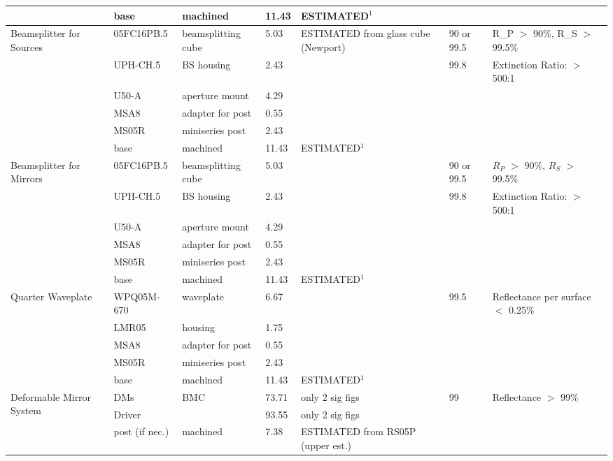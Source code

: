 \documentclass[12pt]{article}
\begin{document}
\begin{landscape}
\begin{center}
\begin{longtable}{| p{3.25cm} | p{2.2cm} | p{3cm} | p{1.75cm} | p{2.5cm} | p{1.55cm} | p{5cm} |}
          & base  & machined & 11.43 & ESTIMATED$^1$ &       &  \\ \hline
    \multirow{6}{*}{\parbox{3.25cm}{Beamsplitter for Sources}} & 05FC16PB.5 & beamsplitting cube & 5.03  & ESTIMATED from glass cube (Newport) & 90 or 99.5 & R\_P $>$ 90\%, R\_S $>$ 99.5\% \\ 
          & UPH-CH.5 & BS housing & 2.43  &       & 99.8  & Extinction Ratio: $>$ 500:1 \\
          & U50-A & aperture mount & 4.29  &       &       &  \\
          & MSA8  & adapter for post & 0.55  &       &       &  \\
          & MS05R & miniseries post & 2.43  &       &       &  \\
          & base  & machined & 11.43 & ESTIMATED$^1$ &       &  \\ \hline
    \multirow{6}{*}{\parbox{3.25cm}{Beamsplitter for Mirrors}} & 05FC16PB.5 & beamsplitting cube & 5.03  &       & 90 or 99.5 & $R_P$ $>$ 90\%, $R_S$ $>$ 99.5\% \\ 
          & UPH-CH.5 & BS housing & 2.43  &       & 99.8  & Extinction Ratio: $>$ 500:1 \\
          & U50-A & aperture mount & 4.29  &       &       &  \\
          & MSA8  & adapter for post & 0.55  &       &       &  \\
          & MS05R & miniseries post & 2.43  &       &       &  \\
          & base  & machined & 11.43 & ESTIMATED$^1$ &       &  \\ \hline
    \multirow{5}{*}{\parbox{3.25cm}{Quarter Waveplate}} & WPQ05M-670 & waveplate & 6.67  &       & 99.5  & Reflectance per surface $<$ 0.25\% \\ 
          & LMR05 & housing & 1.75  &       &       &  \\
          & MSA8  & adapter for post & 0.55  &       &       &  \\
          & MS05R & miniseries post & 2.43  &       &       &  \\
          & base  & machined & 11.43 & ESTIMATED$^1$ &       &  \\ \hline
    \multirow{4}{*}{\parbox{3.25cm}{Deformable Mirror System}} & DMs   & BMC   & 73.71 & only 2 sig figs & 99    & Reflectance $>$ 99\% \\ 
          & Driver &       & 93.55 & only 2 sig figs &       &  \\
          & post (if nec.) & machined & 7.38  & ESTIMATED from RS05P (upper est.) &       &  \\

\end{longtable}
\end{center}
\end{landscape}
\end{document}
